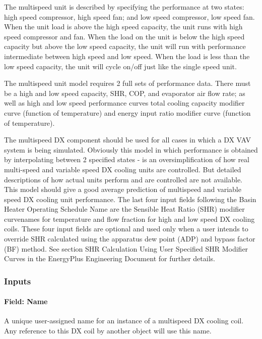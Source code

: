 The multispeed unit is described by specifying the performance at two states: high speed compressor, high speed fan; and low speed compressor, low speed fan. When the unit load is above the high speed capacity, the unit runs with high speed compressor and fan. When the load on the unit is below the high speed capacity but above the low speed capacity, the unit will run with performance intermediate between high speed and low speed. When the load is less than the low speed capacity, the unit will cycle on/off just like the single speed unit.

The multispeed unit model requires 2 full sets of performance data. There must be a high and low speed capacity, SHR, COP, and evaporator air flow rate; as well as high and low speed performance curves total cooling capacity modifier curve (function of temperature) and energy input ratio modifier curve (function of temperature).

The multispeed DX component should be used for all cases in which a DX VAV system is being simulated. Obviously this model in which performance is obtained by interpolating between 2 specified states - is an oversimplification of how real multi-speed and variable speed DX cooling units are controlled. But detailed descriptions of how actual units perform and are controlled are not available. This model should give a good average prediction of multispeed and variable speed DX cooling unit performance. The last four input fields following the Basin Heater Operating Schedule Name are the Sensible Heat Ratio (SHR) modifier curvenames for temperature and flow fraction for high and low speed DX cooling coils. These four input fields are optional and used only when a user intends to override SHR calculated using the apparatus dew point (ADP) and bypass factor (BF) method. See section SHR Calculation Using User Specified SHR Modifier Curves in the EnergyPlus Engineering Document for further details.

\subsubsection{Inputs}\label{inputs-14-004}

\paragraph{Field: Name}\label{field-name-13-003}

A unique user-assigned name for an instance of a multispeed DX cooling coil. Any reference to this DX coil by another object will use this name.

